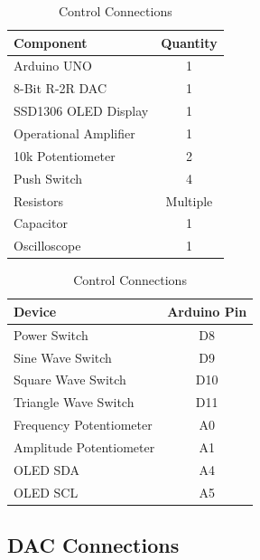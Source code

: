 \begin{table}[H]
\centering

\begin{minipage}[t]{0.48\textwidth}
\centering
\caption{Function Generator Components}
\label{tab:function_components}

\begin{tabular}{|p{4cm}|c|}
\hline
\textbf{Component} & \textbf{Quantity} \\
\hline
Arduino UNO & 1 \\
8-Bit R-2R DAC & 1 \\
SSD1306 OLED Display & 1 \\
Operational Amplifier & 1 \\
10k Potentiometer & 2 \\
Push Switch & 4 \\
Resistors & Multiple \\
Capacitor & 1 \\
Oscilloscope & 1 \\
\hline
\end{tabular}

\end{minipage}
\hfill
\begin{minipage}[t]{0.47\textwidth}
\centering
\caption{Control Connections}
\label{tab:function_control}

\begin{tabular}{|l|c|}
\hline
\textbf{Device} & \textbf{Arduino Pin} \\
\hline
Power Switch & D8 \\
Sine Wave Switch & D9 \\
Square Wave Switch & D10 \\
Triangle Wave Switch & D11 \\
Frequency Potentiometer & A0 \\
Amplitude Potentiometer & A1 \\
OLED SDA & A4 \\
OLED SCL & A5 \\
\hline
\end{tabular}

\end{minipage}

\end{table}


\subsection{DAC Connections}

